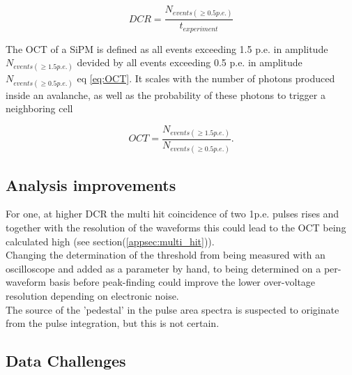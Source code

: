 \documentclass[12pt,article,type=msc,colorback,accentcolor=tud9c]{tudthesis}
\begin{document}
\begin{equation}\label{eq:DCR_eq}
DCR = \frac{N_{events(\geq 0.5p.e.)}}{t_{experiment}}
\end{equation}


The OCT of a SiPM is defined as all events exceeding 1.5 p.e. in amplitude $N_{events(\geq 1.5p.e.)}$ devided by all events exceeding 0.5 p.e. in amplitude $N_{events(\geq 0.5p.e.)}$ eq \ref{eq:OCT}. It scales with the number of photons produced inside an avalanche, as well as the probability of these photons to trigger a neighboring cell

\begin{equation}\label{eq:OCT}
OCT = \frac{N_{events(\geq 1.5p.e.)}}{N_{events(\geq 0.5p.e.)}}.
\end{equation}

\subsection{Analysis improvements}
For one, at higher DCR the multi hit coincidence of two 1p.e. pulses rises and together with the resolution of the waveforms this could lead to the OCT being calculated high (see section(\ref{appsec:multi_hit})).\\ Changing the determination of the threshold from being measured with an oscilloscope and added as a parameter by hand, to being determined on a per-waveform basis before peak-finding could improve the lower over-voltage resolution depending on electronic noise.\\ The source of the 'pedestal' in the pulse area spectra is suspected to originate from the pulse integration, but this is not certain.


\newpage
\subsection{Data Challenges}
\label{subsec:data_challenges}
\end{document}
